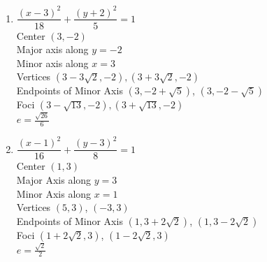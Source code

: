 \begin{multicols}{2}
\begin{enumerate}
\setcounter{enumi}{\value{HW}}

\item $\dfrac{(x - 3)^{2}}{18} + \dfrac{(y + 2)^{2}}{5} = 1$\\
Center $(3, -2)$\\
Major axis along $y = -2$\\
Minor axis along $x = 3$\\
Vertices $(3 - 3\sqrt{2}, -2), (3 + 3\sqrt{2}, -2)$\\
Endpoints of Minor Axis $(3,-2+\sqrt{5})$, $(3,-2-\sqrt{5})$\\
Foci $(3 - \sqrt{13}, -2), (3 + \sqrt{13}, -2)$\\
$e = \frac{\sqrt{26}}{6}$


\vfill

\columnbreak

\item $\dfrac{(x - 1)^{2}}{16} + \dfrac{(y - 3)^{2}}{8} = 1$\\
Center  $(1,3)$ \\
Major Axis along $y=3$\\
Minor Axis along $x=1$\\
Vertices $(5, 3)$, $(-3,3)$\\
Endpoints of Minor Axis $(1,3+2\sqrt{2})$, $(1,3-2\sqrt{2})$\\
Foci $(1 + 2 \sqrt{2}, 3)$, $(1-2 \sqrt{2},3)$\\
$e = \frac{\sqrt{2}}{2}$


\setcounter{HW}{\value{enumi}}
\end{enumerate}
\end{multicols}

\pagebreak

